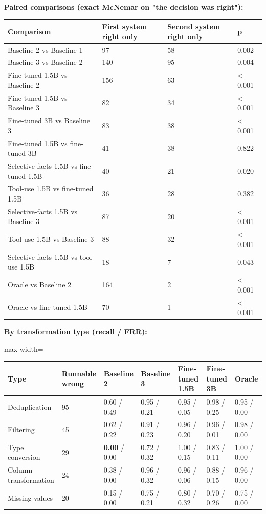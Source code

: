 \documentclass[11pt]{article}
\begin{document}
\textbf{Paired comparisons (exact McNemar on "the decision was right"):}

\begin{table}[!tp]
\centering\footnotesize\setlength{\tabcolsep}{3pt}\renewcommand{\arraystretch}{1.1}
\begin{tabularx}{\textwidth}{>{\raggedright\arraybackslash}Xlll}
\toprule
\textbf{Comparison} & \textbf{First system right only} & \textbf{Second system right only} & \textbf{p} \\
\midrule
Baseline 2 vs Baseline 1 & 97 & 58 & 0.002 \\
Baseline 3 vs Baseline 2 & 140 & 95 & 0.004 \\
Fine-tuned 1.5B vs Baseline 2 & 156 & 63 & < 0.001 \\
Fine-tuned 1.5B vs Baseline 3 & 82 & 34 & < 0.001 \\
Fine-tuned 3B vs Baseline 3 & 83 & 38 & < 0.001 \\
Fine-tuned 1.5B vs fine-tuned 3B & 41 & 38 & 0.822 \\
Selective-facts 1.5B vs fine-tuned 1.5B & 40 & 21 & 0.020 \\
Tool-use 1.5B vs fine-tuned 1.5B & 36 & 28 & 0.382 \\
Selective-facts 1.5B vs Baseline 3 & 87 & 20 & < 0.001 \\
Tool-use 1.5B vs Baseline 3 & 88 & 32 & < 0.001 \\
Selective-facts 1.5B vs tool-use 1.5B & 18 & 7 & 0.043 \\
Oracle vs Baseline 2 & 164 & 2 & < 0.001 \\
Oracle vs fine-tuned 1.5B & 70 & 1 & < 0.001 \\
\bottomrule
\end{tabularx}
\end{table}

\textbf{By transformation type (recall / FRR):}

\begin{table}[!tp]
\centering\footnotesize\setlength{\tabcolsep}{3pt}\renewcommand{\arraystretch}{1.1}
\begin{adjustbox}{max width=\textwidth}\begin{tabular}{lllllll}
\toprule
\textbf{Type} & \textbf{Runnable wrong} & \textbf{Baseline 2} & \textbf{Baseline 3} & \textbf{Fine-tuned 1.5B} & \textbf{Fine-tuned 3B} & \textbf{Oracle} \\
\midrule
Deduplication & 95 & 0.60 / 0.49 & 0.95 / 0.21 & 0.95 / 0.05 & 0.98 / 0.25 & 0.95 / 0.00 \\
Filtering & 45 & 0.62 / 0.22 & 0.91 / 0.23 & 0.96 / 0.20 & 0.96 / 0.01 & 0.98 / 0.00 \\
Type conversion & 29 & \textbf{0.00} / 0.00 & 0.72 / 0.32 & 1.00 / 0.15 & 0.83 / 0.11 & 1.00 / 0.00 \\
Column transformation & 24 & 0.38 / 0.00 & 0.96 / 0.32 & 0.96 / 0.06 & 0.88 / 0.15 & 0.96 / 0.00 \\
Missing values & 20 & 0.15 / 0.00 & 0.75 / 0.21 & 0.80 / 0.32 & 0.70 / 0.26 & 0.75 / 0.00 \\
\bottomrule
\end{tabular}\end{adjustbox}
\end{table}
\end{document}
